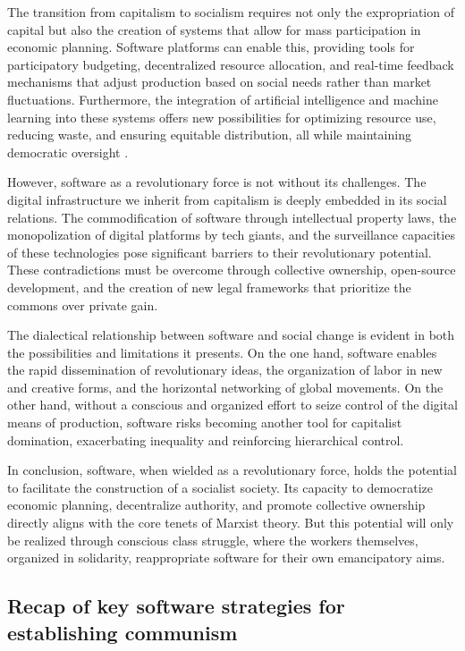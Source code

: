 \begin{refsection}
The transition from capitalism to socialism requires not only the expropriation of capital but also the creation of systems that allow for mass participation in economic planning. Software platforms can enable this, providing tools for participatory budgeting, decentralized resource allocation, and real-time feedback mechanisms that adjust production based on social needs rather than market fluctuations. Furthermore, the integration of artificial intelligence and machine learning into these systems offers new possibilities for optimizing resource use, reducing waste, and ensuring equitable distribution, all while maintaining democratic oversight \cite[pp.~254-257]{cockshott1993}.

However, software as a revolutionary force is not without its challenges. The digital infrastructure we inherit from capitalism is deeply embedded in its social relations. The commodification of software through intellectual property laws, the monopolization of digital platforms by tech giants, and the surveillance capacities of these technologies pose significant barriers to their revolutionary potential. These contradictions must be overcome through collective ownership, open-source development, and the creation of new legal frameworks that prioritize the commons over private gain.

The dialectical relationship between software and social change is evident in both the possibilities and limitations it presents. On the one hand, software enables the rapid dissemination of revolutionary ideas, the organization of labor in new and creative forms, and the horizontal networking of global movements. On the other hand, without a conscious and organized effort to seize control of the digital means of production, software risks becoming another tool for capitalist domination, exacerbating inequality and reinforcing hierarchical control.

In conclusion, software, when wielded as a revolutionary force, holds the potential to facilitate the construction of a socialist society. Its capacity to democratize economic planning, decentralize authority, and promote collective ownership directly aligns with the core tenets of Marxist theory. But this potential will only be realized through conscious class struggle, where the workers themselves, organized in solidarity, reappropriate software for their own emancipatory aims.

\subsection{Recap of key software strategies for establishing communism}


\end{refsection}
